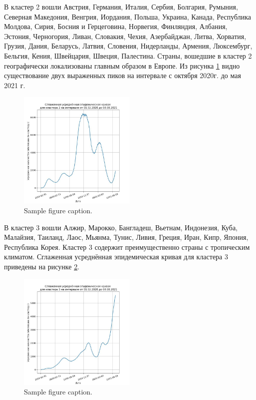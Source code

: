 \documentclass{article}
\begin{document}
В кластер 2 вошли Австрия, Германия, Италия, Сербия, Болгария, Румыния, Северная Македония, Венгрия, Иордания, Польша, Украина, Канада, Республика Молдова, Сирия, Босния и Герцеговина, Норвегия, Финляндия, Албания, Эстония, Черногория, Ливан, Словакия, Чехия, Азербайджан, Литва, Хорватия, Грузия, Дания, Беларусь, Латвия, Словения, Нидерланды, Армения, Люксембург, Бельгия, Кения, Швейцария, Швеция, Палестина.
Страны, вошедшие в кластер 2 географически локализованы главным образом в Европе. Из рисунка \ref{fig:fig2} видно существование двух выраженных пиков на интервале с октября 2020г. до
мая 2021 г.

\begin{figure}
	\centering
	\includegraphics[width=0.5\textwidth]{../figures/clasters2.jpg}
	\caption{Sample figure caption.}
	\label{fig:fig2}
\end{figure}


В кластер 3 вошли Алжир, Марокко, Бангладеш, Вьетнам, Индонезия, Куба, Малайзия, Таиланд, Лаос, Мьянма, Тунис, Ливия, Греция, Иран, Кипр, Япония, Республика Корея. Кластер 3 содержит преимущественно страны с тропическим климатом. Сглаженная усреднённая эпидемическая кривая для кластера 3 приведены на рисунке \ref{fig:fig3}.

\begin{figure}
	\centering
	\includegraphics[width=0.5\textwidth]{../figures/clasters3.jpg}
	\caption{Sample figure caption.}
	\label{fig:fig3}
\end{figure}
\end{document}
